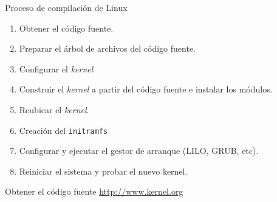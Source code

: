 \begin{frame}{Proceso de compilación de Linux}
\begin{enumerate}
\item Obtener el código fuente.
\item Preparar el árbol de archivos del código fuente.
\item Configurar el \textit{kernel}
\item Construir el \textit{kernel} a partir del código fuente e instalar los
  módulos.
\item Reubicar el \textit{kernel}.
\item Creación del \texttt{initramfs}
\item Configurar y ejecutar el gestor de arranque (LILO, GRUB, etc).
\item Reiniciar el sistema y probar el nuevo kernel.
\end{enumerate}
\end{frame}

\begin{frame}{Obtener el código fuente}
  \large \url{http://www.kernel.org}
  \begin{center}
   \end{center}
\end{frame}

